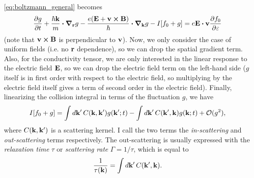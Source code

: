 \documentclass[12pt]{article}
\begin{document}
\eqref{eq:boltzmann_general} becomes
\begin{equation}
    \pdv{g}{t} + \frac{\hbar\vb{k}}{m}\vdot\grad_{\vb{r}} g
    - \frac{e(\vb{E} + \vb{v}\cross\vb{B})}{\hbar}\vdot\grad_{\vb{k}}g - I[f_0 + g]
    = e\vb{E}\vdot\vb{v}\pdv{f_0}{\varepsilon} \label{eq:boltzmann}
\end{equation}
(note that $\vb{v}\cross\vb{B}$ is perpendicular to $\vb{v}$). Now, we only consider the case of
uniform fields (i.e. no $\vb{r}$ dependence), so we can drop the spatial gradient term. Also, for
the conductivity tensor, we are only interested in the linear response to the electric field
$\vb{E}$, so we can drop the electric field term on the left-hand side ($g$ itself is in first order
with respect to the electric field, so multiplying by the electric field itself gives a term of
second order in the electric field). Finally, linearizing the collision integral in terms of the
fluctuation $g$, we have
\begin{equation}
    I[f_0 + g] = \int\dd{\vb{k'}} C(\vb{k}, \vb{k'}) g(\vb{k'}; t)
    - \int\dd{\vb{k'}} C(\vb{k'}, \vb{k}) g(\vb{k}; t) + \mathcal{O}(g^2),
\end{equation} 
where $C(\vb{k}, \vb{k'})$ is a scattering kernel. I call the two terms the \emph{in-scattering} and
\emph{out-scattering} terms respectively. The out-scattering is usually expressed with the
\emph{relaxation time} $\tau$ or \emph{scattering rate} $\Gamma=1/\tau$, which is equal to
\begin{equation}
    \frac{1}{\tau(\vb{k})} = \int\dd{\vb{k'}} C(\vb{k'}, \vb{k}).
\end{equation}

\end{document}
